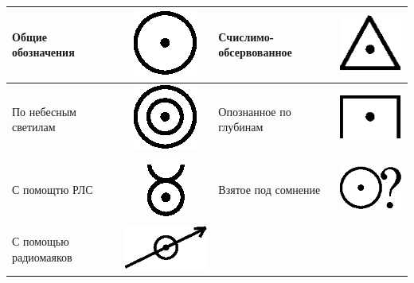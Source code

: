 \documentclass[a4paper, 12pt, twoside, final, book, russian, fittopage, cyremdash]{ncc}
\begin{document}
\begin{table}[htb]
  \centering{}
  \begin{tabular}[c]{l|c||l|c}
    \toprule
    Общие обозначения & \includegraphics[scale=0.6]{obshie_oboznacheniya.eps} & 
    Счислимо-обсервованное & \includegraphics[scale=0.6]{schislimo.eps} \\
    \midrule
    По небесным светилам & \includegraphics[scale=0.6]{po_nebesnym_svetilam.eps} & 
    Опознанное по глубинам & \includegraphics[scale=0.6]{po_glubinam.eps} \\
    \midrule
    С помощтю РЛС & \includegraphics[scale=0.6]{RLS.eps} & 
    Взятое под сомнение & \includegraphics[scale=0.6]{vzyatoe_pod_somnenie.eps} \\
    \midrule
    С помощью радиомаяков & \includegraphics[scale=0.6]{radiomayak.eps} & 

\end{tabular}
\end{table}
\end{document}
